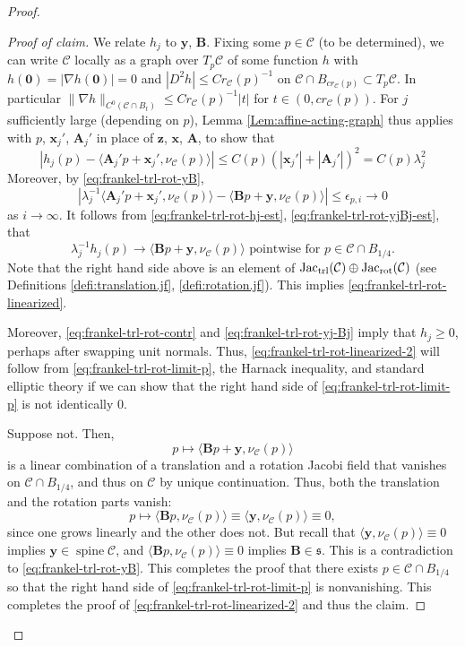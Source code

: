 \documentclass[11pt, letterpaper, reqno]{amsart}
\numberwithin{equation}{section}
\theoremstyle{remark}
\newcommand{\cC}{\mathcal{C}}
\newcommand{\mbfA}{\mathbf{A}}
\newcommand{\mbfB}{\mathbf{B}}
\newcommand{\mbfx}{\mathbf{x}}
\newcommand{\mbfy}{\mathbf{y}}
\newcommand{\mbfz}{\mathbf{z}}
\newcommand{\Jac}{\operatorname{Jac}}
\newcommand{\spine}{\operatorname{spine}}
\newcommand{\orig}{\mathbf{0}}
\begin{document}
\begin{proof}
\begin{proof}[Proof of claim]
    We relate $h_j$ to $\mbfy$, $\mbfB$. Fixing some $p \in \cC$ (to be determined), we can write $\cC$ locally as a graph over $T_p \cC$ of some function $h$ with $h(\orig) = |\nabla h(\orig)| = 0$ and $|D^2 h| \leq C r_\cC(p)^{-1}$ on $\cC \cap B_{cr_{\cC}(p)} \subset T_p \cC$. In particular $\|\nabla h\|_{C^0(\cC \cap B_t)} \leq C r_{\cC}(p)^{-1} |t|$ for $t \in (0,cr_\cC(p))$. For $j$ sufficiently large (depending on $p$), Lemma \ref{Lem:affine-acting-graph} thus applies with $p$, $\mbfx_j'$, $\mbfA_j'$ in place of $\mbfz$, $\mbfx$, $\mbfA$, to show that
\begin{equation} \label{eq:frankel-trl-rot-hj-est}
	|h_j(p) - \langle \mbfA_j' p + \mbfx_j', \nu_\cC(p) \rangle| \leq C(p) (|\mbfx_j'| + |\mbfA_j'|)^2 = C(p) \lambda_j^2
\end{equation}
Moreover, by \eqref{eq:frankel-trl-rot-yB},
\begin{equation} \label{eq:frankel-trl-rot-yjBj-est}
	|\lambda_j^{-1} \langle \mbfA_j' p + \mbfx_j', \nu_\cC(p) \rangle - \langle \mbfB p + \mbfy, \nu_\cC(p) \rangle| \leq \epsilon_{p,i} \to 0
\end{equation}
as $i \to \infty$. It follows from \eqref{eq:frankel-trl-rot-hj-est}, \eqref{eq:frankel-trl-rot-yjBj-est}, that
\begin{equation}\label{eq:frankel-trl-rot-limit-p}
\lambda_j^{-1}h_j(p) \to \langle \mbfB p + \mbfy,\nu_\cC(p)\rangle \text{ pointwise for } p \in \cC \cap B_{1/4}.
\end{equation}
Note that the right hand side above is an element of $\Jac_\textnormal{trl}(\cC) \oplus \Jac_\textnormal{rot}(\cC)$ (see Definitions \ref{defi:translation.jf}, \ref{defi:rotation.jf}). This implies \eqref{eq:frankel-trl-rot-linearized}.

Moreover, \eqref{eq:frankel-trl-rot-contr} and \eqref{eq:frankel-trl-rot-yj-Bj} imply that $h_j \geq 0$, perhaps after swapping unit normals. Thus, \eqref{eq:frankel-trl-rot-linearized-2} will follow from \eqref{eq:frankel-trl-rot-limit-p}, the Harnack inequality, and standard elliptic theory if we can show that the right hand side of \eqref{eq:frankel-trl-rot-limit-p} is not identically $0$.

Suppose not. Then, 
\[ p \mapsto \langle \mbfB p + \mbfy, \nu_\cC(p) \rangle \]
is a linear combination of a translation and a rotation Jacobi field that vanishes on $\cC \cap B_{1/4}$, and thus on $\cC$ by unique continuation. Thus, both the translation and the rotation parts vanish:
\[ p \mapsto \langle \mbfB p, \nu_\cC(p) \rangle \equiv \langle \mbfy, \nu_\cC(p) \rangle \equiv 0, \]
since one grows linearly and the other does not. But recall that $\langle \mbfy, \nu_\cC(p) \rangle \equiv 0$ implies $\mbfy \in \spine \cC$, and $\langle \mbfB p, \nu_\cC(p) \rangle \equiv 0$ implies $\mbfB \in \mathfrak{s}$. This is a contradiction to \eqref{eq:frankel-trl-rot-yB}. This completes the proof that there exists $p \in \cC \cap B_{1/4}$ so that the right hand side of \eqref{eq:frankel-trl-rot-limit-p} is nonvanishing. This completes the proof of \eqref{eq:frankel-trl-rot-linearized-2} and thus the claim.
\end{proof}


\end{proof}
\end{document}
